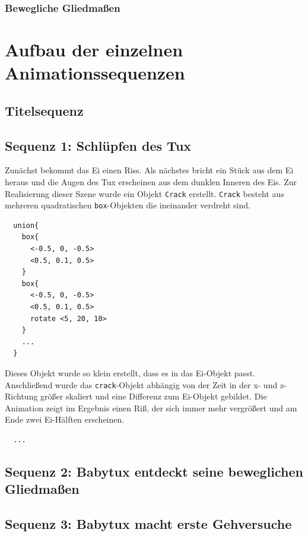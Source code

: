 \documentclass[11pt,parskip]{scrartcl}
\begin{document}
\subsubsection{Bewegliche Gliedmaßen}


\newpage

\section{Aufbau der einzelnen Animationssequenzen}


\subsection{Titelsequenz}


\subsection{Sequenz 1: Schlüpfen des Tux}
Zunächst bekommt das Ei einen Riss. Als nächstes bricht ein Stück aus dem Ei
heraus und die Augen des Tux erscheinen aus dem dunklen Inneren des Eis. Zur
Realisierung dieser Szene wurde ein Objekt \texttt{Crack} erstellt.
\texttt{Crack} besteht aus mehreren quadratischen \texttt{box}-Objekten die
ineinander verdreht sind.
%
\begin{lstlisting}
  union{
    box{
      <-0.5, 0, -0.5>
      <0.5, 0.1, 0.5>
    }
    box{
      <-0.5, 0, -0.5>
      <0.5, 0.1, 0.5>
      rotate <5, 20, 10>
    }
    ...
  }
\end{lstlisting}
%
Dieses Objekt wurde so klein erstellt, dass es in das Ei-Objekt passt.
Anschließend wurde das \texttt{crack}-Objekt abhängig von der Zeit in der x- und
z-Richtung größer skaliert und eine Differenz zum Ei-Objekt gebildet. Die
Animation zeigt im Ergebnis einen Riß, der sich immer mehr vergrößert und am
Ende zwei Ei-Hälften erscheinen.
%
\begin{lstlisting}
  ...
\end{lstlisting}
%

\subsection{Sequenz 2: Babytux entdeckt seine beweglichen Gliedmaßen}


\subsection{Sequenz 3: Babytux macht erste Gehversuche}
\end{document}
